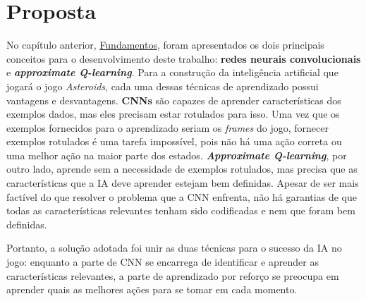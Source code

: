 %
\chapter{Proposta}
\label{cap:proposta}

No capítulo anterior, \hyperref[cap:fundamentos]{Fundamentos}, foram apresentados os dois principais conceitos para o desenvolvimento deste trabalho: \textbf{redes neurais convolucionais} e \textbf{\textit{approximate Q-learning}}.
Para a construção da inteligência artificial que jogará o jogo \textit{Asteroids}, cada uma dessas técnicas de aprendizado possui vantagens e desvantagens.
\textbf{CNNs} são capazes de aprender características dos exemplos dados, mas eles precisam estar rotulados para isso. Uma vez que os exemplos fornecidos para o aprendizado seriam os \textit{frames} do jogo, fornecer exemplos rotulados é uma tarefa impossível, pois não há uma ação correta ou uma melhor ação na maior parte dos estados.
\textbf{\textit{Approximate Q-learning}}, por outro lado, aprende sem a necessidade de exemplos rotulados, mas precisa que as características que a IA deve aprender estejam bem definidas. Apesar de ser mais factível do que resolver o problema que a CNN enfrenta, não há garantias de que todas as características relevantes tenham sido codificadas e nem que foram bem definidas.

Portanto, a solução adotada foi unir as duas técnicas para o sucesso da IA no jogo: enquanto a parte de CNN se encarrega de identificar e aprender as características relevantes, a parte de aprendizado por reforço se preocupa em aprender quais as melhores ações para se tomar em cada momento.

